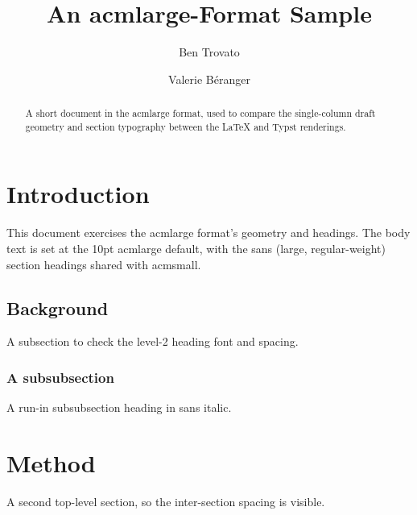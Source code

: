 \documentclass[acmlarge]{acmart}
\begin{document}
\title{An acmlarge-Format Sample}

\author{Ben Trovato}

\author{Valerie B\'eranger}

\begin{abstract}
  A short document in the acmlarge format, used to compare the single-column
  draft geometry and section typography between the LaTeX and Typst renderings.
\end{abstract}


\maketitle

\section{Introduction}
This document exercises the acmlarge format's geometry and headings. The body
text is set at the 10pt acmlarge default, with the sans (large, regular-weight) section
headings shared with acmsmall.

\subsection{Background}
A subsection to check the level-2 heading font and spacing.

\subsubsection{A subsubsection}
A run-in subsubsection heading in sans italic.

\section{Method}
A second top-level section, so the inter-section spacing is visible.
\end{document}
